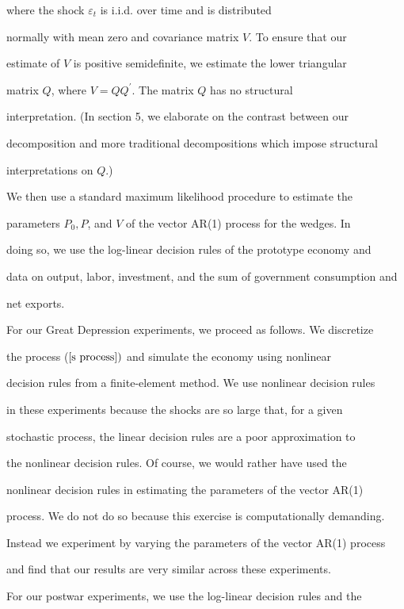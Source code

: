 \documentclass[fleqn,leqno,11pt]{article}
\begin{document}
where the shock $\varepsilon _{t}$ is i.i.d. over time and is distributed

normally with mean zero and covariance matrix $V.$ To ensure that our

estimate of $V$ is positive semidefinite, we estimate the lower triangular

matrix $Q$, where $V=QQ^{\prime }.$ The matrix $Q$ has no structural

interpretation. (In section 5, we elaborate on the contrast between our

decomposition and more traditional decompositions which impose structural

interpretations on $Q$.)



We then use a standard maximum likelihood procedure to estimate the

parameters $P_{0},P$, and $V$ of the vector AR(1) process for the wedges. In

doing so, we use the log-linear decision rules of the prototype economy and

data on output, labor, investment, and the sum of government consumption and

net exports.



For our Great Depression experiments, we proceed as follows. We discretize

the process ($\ref{s process})$ and simulate the economy using nonlinear

decision rules from a finite-element method. We use nonlinear decision rules

in these experiments because the shocks are so large that, for a given

stochastic process, the linear decision rules are a poor approximation to

the nonlinear decision rules. Of course, we would rather have used the

nonlinear decision rules in estimating the parameters of the vector AR(1)

process. We do not do so because this exercise is computationally demanding.

Instead we experiment by varying the parameters of the vector AR(1) process

and find that our results are very similar across these experiments.



For our postwar experiments, we use the log-linear decision rules and the
\end{document}
